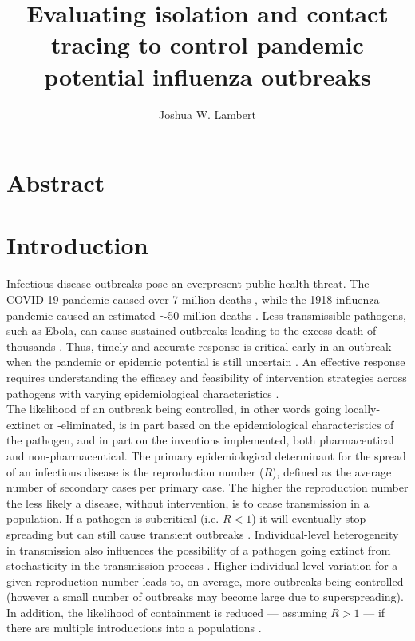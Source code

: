 \documentclass{article}
\title{Evaluating isolation and contact tracing to control pandemic potential influenza outbreaks}
\author{Joshua W. Lambert}
\date{}
\begin{document}
\maketitle

\section*{Abstract}

\section*{Introduction}

Infectious disease outbreaks pose an everpresent public health threat. The COVID-19 pandemic caused over 7 million deaths \citep{whocovid-19dashboardCOVID19DeathsWHO}, while the 1918 influenza pandemic caused an estimated $\sim$50 million deaths \citep{johnsonUpdatingAccountsGlobal2002}. Less transmissible pathogens, such as Ebola, can cause sustained outbreaks leading to the excess death of thousands \citep{whoebolaresponseteamEbolaVirusDisease2014}. Thus, timely and accurate response is critical early in an outbreak when the pandemic or epidemic potential is still uncertain \citep{kucharskiControllingMinorOutbreaks2024}. An effective response requires understanding the efficacy and feasibility of intervention strategies across pathogens with varying epidemiological characteristics \citep{fraserFactorsThatMake2004}. \\

The likelihood of an outbreak being controlled, in other words going locally-extinct or -eliminated, is in part based on the epidemiological characteristics of the pathogen, and in part on the inventions implemented, both pharmaceutical and non-pharmaceutical. The primary epidemiological determinant for the spread of an infectious disease is the reproduction number ($R$), defined as the average number of secondary cases  per primary case. The higher the reproduction number the less likely a disease, without intervention, is to cease transmission in a population. If a pathogen is subcritical (i.e. $R < 1$) it will eventually stop spreading but can still cause transient outbreaks \citep{farringtonDistributionTimeExtinction1999}. Individual-level heterogeneity in transmission also influences the possibility of a pathogen going extinct from stochasticity in the transmission process \citep{lloyd-smithSuperspreadingEffectIndividual2005}. Higher individual-level variation for a given reproduction number leads to, on average, more outbreaks being controlled (however a small number of outbreaks may become large due to superspreading). In addition, the likelihood of containment is reduced --- assuming $R > 1$ --- if there are multiple introductions into a populations \citep{kucharskiEarlyDynamicsTransmission2020}. \\
\end{document}
